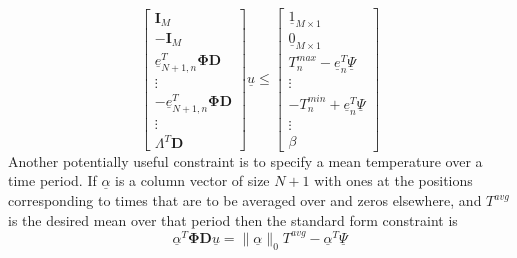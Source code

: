 \documentclass[11pt]{article}
\begin{document}
\begin{equation}
\left[
\begin{array}{c}
\mathbf{I}_{M} \\ \hline
- \mathbf{I}_{M} \\ \hline
\underline{e}_{N+1,n}^{T}  \mathbf{\Phi D}  \\
\vdots \\ \hline
-\underline{e}_{N+1,n}^{T}  \mathbf{\Phi D}  \\ 
\vdots \\ \hline
\Lambda^{T} \mathbf{D}
\end{array}\right]
\underline{u}\leq \left[
\begin{array}{c}
\underline{1}_{M \times 1} \\ \hline
\underline{0}_{M \times 1} \\ \hline
T^{max}_{n}-\underline{e}_{n}^{T} \underline{\Psi} \\
\vdots \\ \hline
-T^{min}_{n}+\underline{e}_{n}^{T} \underline{\Psi} \\ 
\vdots \\ \hline
\beta
\end{array}\right]
\end{equation}
Another potentially useful constraint is to specify a mean temperature over a time period. If $\underline{\alpha}$ is a column vector of size $N+1$ with ones at the positions corresponding to times that are to be averaged over and zeros elsewhere, and $T^{avg}$ is the desired mean over that period then the standard form constraint is
\begin{equation}
\underline{\alpha}^{T} \mathbf{\Phi} \mathbf{D} \underline{u} = \|\underline{\alpha}\|_{0} T^{avg} -\underline{\alpha}^{T} \underline{\Psi}
\end{equation}
\end{document}
